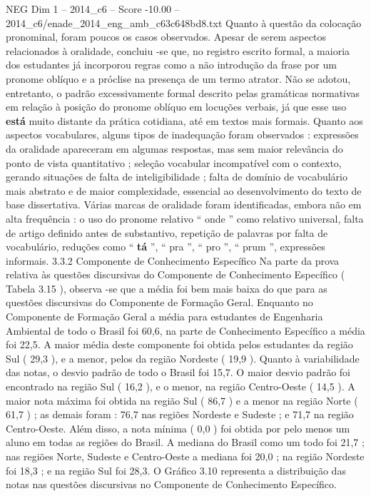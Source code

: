 \begin{textsample}{NEG Dim 1 – 2014\_c6 – Score -10.00 – 2014\_c6/enade\_2014\_eng\_amb\_c63c648bd8.txt}
Quanto à questão da colocação pronominal, foram poucos os casos observados.
Apesar de serem aspectos relacionados à oralidade, concluiu -se que, no registro escrito formal, a maioria dos estudantes já incorporou regras como a não introdução da frase por um pronome oblíquo e a próclise na presença de um termo atrator.
Não se adotou, entretanto, o padrão excessivamente formal descrito pelas gramáticas normativas em relação à posição do pronome oblíquo em locuções verbais, já que esse uso \textbf{está} muito distante da prática cotidiana, até em textos mais formais.
Quanto aos aspectos vocabulares, alguns tipos de inadequação foram observados : expressões da oralidade apareceram em algumas respostas, mas sem maior relevância do ponto de vista quantitativo ; seleção vocabular incompatível com o contexto, gerando situações de falta de inteligibilidade ; falta de domínio de vocabulário mais abstrato e de maior complexidade, essencial ao desenvolvimento do texto de base dissertativa.
Várias marcas de oralidade foram identificadas, embora não em alta frequência : o uso do pronome relativo “ onde ” como relativo universal, falta de artigo definido antes de substantivo, repetição de palavras por falta de vocabulário, reduções como “ \textbf{tá} ”, “ pra ”, “ pro ”, “ prum ”, expressões informais. 3.3.2 Componente de Conhecimento Específico Na parte da prova relativa às questões discursivas do Componente de Conhecimento Específico ( Tabela 3.15 ), observa -se que a média foi bem mais baixa do que para as questões discursivas do Componente de Formação Geral.
Enquanto no Componente de Formação Geral a média para estudantes de Engenharia Ambiental de todo o Brasil foi 60,6, na parte de Conhecimento Específico a média foi 22,5.
A maior média deste componente foi obtida pelos estudantes da região Sul ( 29,3 ), e a menor, pelos da região Nordeste ( 19,9 ).
Quanto à variabilidade das notas, o desvio padrão de todo o Brasil foi 15,7.
O maior desvio padrão foi encontrado na região Sul ( 16,2 ), e o menor, na região Centro-Oeste ( 14,5 ).
A maior nota máxima foi obtida na região Sul ( 86,7 ) e a menor na região Norte ( 61,7 ) ; as demais foram : 76,7 nas regiões Nordeste e Sudeste ; e 71,7 na região Centro-Oeste.
Além disso, a nota mínima ( 0,0 ) foi obtida por pelo menos um aluno em todas as regiões do Brasil.
A mediana do Brasil como um todo foi 21,7 ; nas regiões Norte, Sudeste e Centro-Oeste a mediana foi 20,0 ; na região Nordeste foi 18,3 ; e na região Sul foi 28,3.
O Gráfico 3.10 representa a distribuição das notas nas questões discursivas no Componente de Conhecimento Específico.

\end{textsample}

